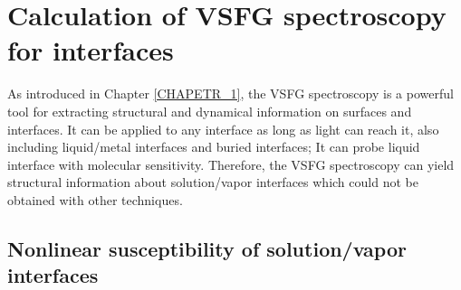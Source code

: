 \section{Calculation of VSFG spectroscopy for interfaces}\label{section_VSFG}
As introduced in Chapter \ref{CHAPETR_1}, the VSFG spectroscopy is a powerful tool for extracting structural and dynamical information
on surfaces and interfaces.
It can be applied to any interface as long as light can reach it, also including liquid/metal interfaces\cite{Harris90,Harris90b,DaiHL95,Halevi96,Wieckowski99} 
and buried interfaces\cite{Chen99,Chen07};
It can probe liquid interface with molecular sensitivity\cite{Khatib16,Khatib16b,Khatib2017}.
Therefore, the VSFG spectroscopy can yield structural information about solution/vapor interfaces which could not be obtained with other techniques.

\subsection{Nonlinear susceptibility of solution/vapor interfaces}
